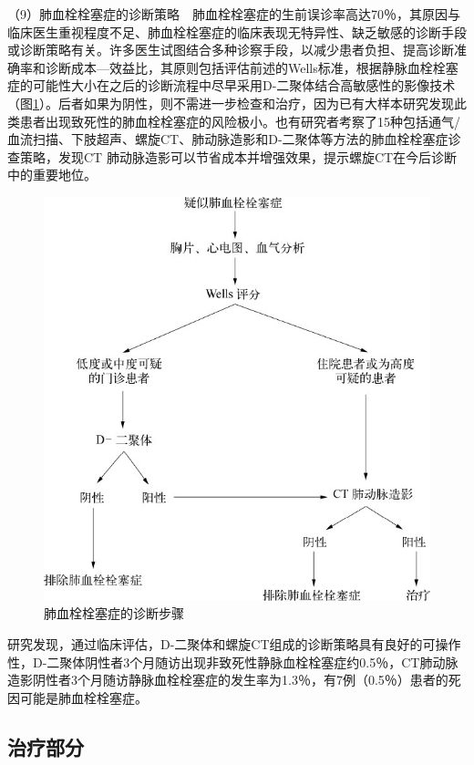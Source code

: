 （9）肺血栓栓塞症的诊断策略　肺血栓栓塞症的生前误诊率高达70％，其原因与临床医生重视程度不足、肺血栓栓塞症的临床表现无特异性、缺乏敏感的诊断手段或诊断策略有关。许多医生试图结合多种诊察手段，以减少患者负担、提高诊断准确率和诊断成本---效益比，其原则包括评估前述的Wells标准，根据静脉血栓栓塞症的可能性大小在之后的诊断流程中尽早采用D-二聚体结合高敏感性的影像技术（图\ref{fig16-2}）。后者如果为阴性，则不需进一步检查和治疗，因为已有大样本研究发现此类患者出现致死性的肺血栓栓塞症的风险极小。也有研究者考察了15种包括通气/血流扫描、下肢超声、螺旋CT、肺动脉造影和D-二聚体等方法的肺血栓栓塞症诊查策略，发现CT
肺动脉造影可以节省成本并增强效果，提示螺旋CT在今后诊断中的重要地位。

\begin{figure}[!htbp]
 \centering
 \includegraphics{./images/Image00127.jpg}
 \captionsetup{justification=centering}
 \caption{肺血栓栓塞症的诊断步骤}
 \label{fig16-2}
  \end{figure} 

研究发现，通过临床评估，D-二聚体和螺旋CT组成的诊断策略具有良好的可操作性，D-二聚体阴性者3个月随访出现非致死性静脉血栓栓塞症约0.5％，CT肺动脉造影阴性者3个月随访静脉血栓栓塞症的发生率为1.3％，有7例（0.5％）患者的死因可能是肺血栓栓塞症。

\subsection{治疗部分}

